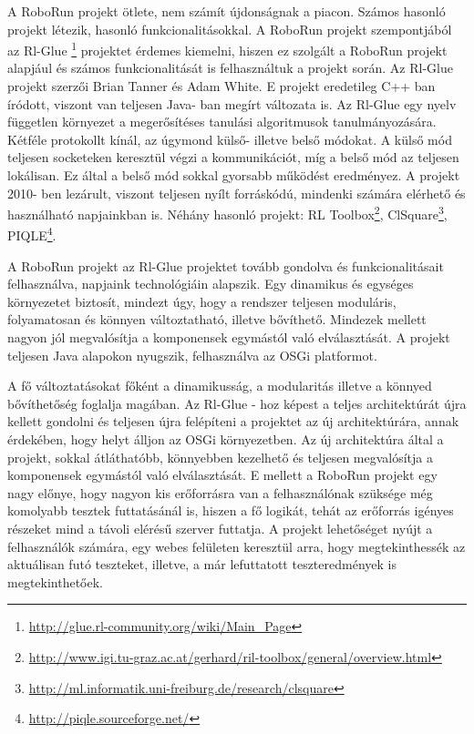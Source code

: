 	A RoboRun projekt ötlete, nem számít újdonságnak a piacon. Számos hasonló projekt létezik, hasonló funkcionalitásokkal. A RoboRun projekt szempontjából az Rl-Glue \footnote{\href {http://glue.rl-community.org/wiki/Main\_Page}{http://glue.rl-community.org/wiki/Main\_Page}} projektet érdemes kiemelni, hiszen ez szolgált a RoboRun projekt alapjául és számos funkcionalitását is felhasználtuk a projekt során. Az Rl-Glue\cite{rlglue} projekt szerzői Brian Tanner és Adam White. E projekt eredetileg C++ ban íródott, viszont van teljesen Java- ban megírt változata is. Az Rl-Glue egy nyelv független környezet a megerősítéses tanulási algoritmusok tanulmányozására. Kétféle protokollt kínál, az úgymond külső- illetve belső módokat. A külső mód teljesen socketeken keresztül végzi a kommunikációt, míg a belső mód az teljesen lokálisan. Ez által a belső mód sokkal gyorsabb működést eredményez. A projekt 2010- ben lezárult, viszont teljesen nyílt forráskódú, mindenki számára elérhető és használható napjainkban is. Néhány hasonló projekt: RL Toolbox\footnote{\href {http://www.igi.tu-graz.ac.at/gerhard/ril-toolbox/general/overview.html}{http://www.igi.tu-graz.ac.at/gerhard/ril-toolbox/general/overview.html}}, ClSquare\footnote{\href {http://ml.informatik.uni-freiburg.de/research/clsquare}{http://ml.informatik.uni-freiburg.de/research/clsquare}}, PIQLE\footnote{\href{http://piqle.sourceforge.net/}{http://piqle.sourceforge.net/}}. 


	A RoboRun projekt az Rl-Glue projektet tovább gondolva és funkcionalitásait felhasználva, napjaink technológiáin alapszik. Egy dinamikus és egységes környezetet biztosít, mindezt úgy, hogy a rendszer teljesen moduláris, folyamatosan és könnyen változtatható, illetve bővíthető. Mindezek mellett nagyon jól megvalósítja a komponensek egymástól való elválasztását. A projekt teljesen Java alapokon nyugszik, felhasználva az OSGi platformot. 
	
	A fő változtatásokat főként a dinamikusság, a modularitás illetve a könnyed bővíthetőség foglalja magában. Az Rl-Glue - hoz képest a teljes architektúrát újra kellett gondolni és teljesen újra felépíteni a projektet az új architektúrára, annak érdekében, hogy helyt álljon az OSGi környezetben. Az új architektúra által a projekt, sokkal átláthatóbb, könnyebben kezelhető és teljesen megvalósítja a komponensek egymástól való elválasztását. E mellett a RoboRun projekt egy nagy előnye, hogy nagyon kis erőforrásra van a felhasználónak szüksége még komolyabb tesztek futtatásánál is, hiszen a fő logikát, tehát az erőforrás igényes részeket mind a távoli elérésű szerver futtatja. A projekt lehetőséget nyújt a felhasználók számára, egy webes felületen keresztül arra, hogy megtekinthessék az aktuálisan futó teszteket, illetve, a már lefuttatott teszteredmények is megtekinthetőek.
	
